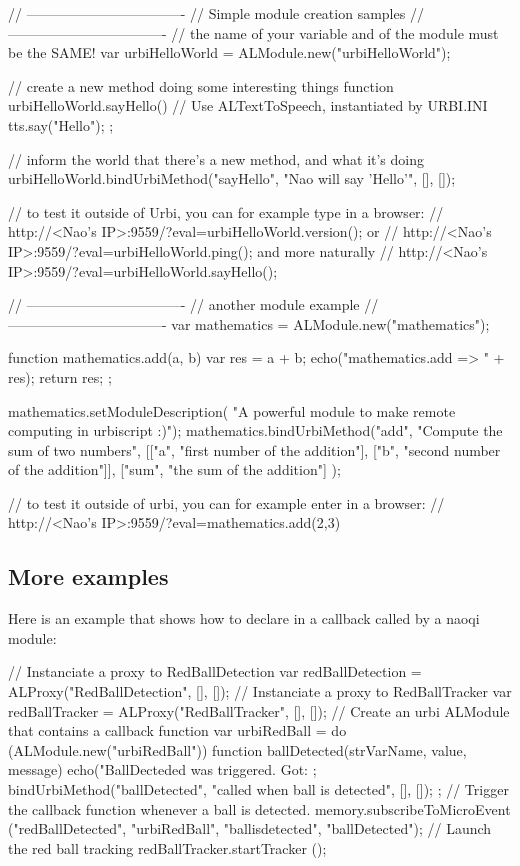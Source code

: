 \begin{urbiunchecked}
// ----------------------------------
// Simple module creation samples
// ----------------------------------
// the name of your variable and of the module must be the SAME!
var urbiHelloWorld = ALModule.new("urbiHelloWorld");

// create a new method doing some interesting things
function urbiHelloWorld.sayHello()
{
  // Use ALTextToSpeech, instantiated by URBI.INI
  tts.say("Hello");
};

// inform the world that there's a new method, and what it's doing
urbiHelloWorld.bindUrbiMethod("sayHello", "Nao will say 'Hello'", [], []);

// to test it outside of Urbi, you can for example type in a browser:
// http://<Nao's IP>:9559/?eval=urbiHelloWorld.version(); or
// http://<Nao's IP>:9559/?eval=urbiHelloWorld.ping(); and more naturally
// http://<Nao's IP>:9559/?eval=urbiHelloWorld.sayHello();

// ----------------------------------
// another module example
// ----------------------------------
var mathematics = ALModule.new("mathematics");

function mathematics.add(a, b)
{
  var res = a + b;
  echo("mathematics.add => " + res);
  return res;
};

mathematics.setModuleDescription(
  "A powerful module to make remote computing in urbiscript :)");
mathematics.bindUrbiMethod("add", "Compute the sum of two numbers",
[["a",   "first number of the addition"],
 ["b",   "second number of the addition"]],
 ["sum", "the sum of the addition"] );

// to test it outside of urbi, you can for example enter in a browser:
// http://<Nao's IP>:9559/?eval=mathematics.add(2,3)
\end{urbiunchecked}


\subsection{More examples}

Here is an example that shows how to declare in \us a callback called by a naoqi module:

\begin{urbiunchecked}
// Instanciate a proxy to RedBallDetection
var redBallDetection = ALProxy("RedBallDetection", [], []);
// Instanciate a proxy to RedBallTracker
var redBallTracker = ALProxy("RedBallTracker", [], []);
// Create an urbi ALModule that contains a callback function
var urbiRedBall = do (ALModule.new("urbiRedBall"))
{
  function ballDetected(strVarName, value, message) {
    echo("BallDecteded was triggered. Got: %
  };
  bindUrbiMethod("ballDetected", "called when ball is detected", [], []);
};
// Trigger the callback function whenever a ball is detected.
memory.subscribeToMicroEvent ("redBallDetected", "urbiRedBall", "ballisdetected", "ballDetected");
// Launch the red ball tracking
redBallTracker.startTracker ();
\end{urbiunchecked}


